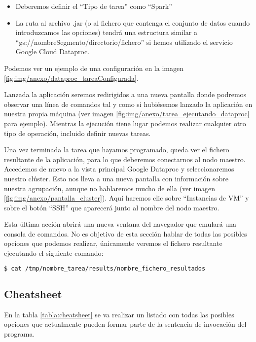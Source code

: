 \begin{itemize}
\item Deberemos definir el ``Tipo de tarea'' como ``Spark''
\item La ruta al archivo .jar (o al fichero que contenga el conjunto de datos cuando introduzcamos las opciones) tendrá una estructura similar a ``gs://nombreSegmento/directorio/fichero'' si hemos utilizado el servicio Google Cloud Dataproc.
\end{itemize}


Podemos ver un ejemplo de una configuración en la imagen \ref{fig:img/anexo/dataproc_tareaConfigurada}.


Lanzada la aplicación seremos redirigidos a una nueva pantalla donde podremos observar una línea de comandos tal y como si hubiésemos  lanzado la aplicación en nuestra propia máquina (ver imagen \ref{fig:img/anexo/tarea_ejecutando_dataproc} para ejemplo). Mientras la ejecución tiene lugar podemos realizar cualquier otro tipo de operación, incluido definir nuevas tareas.


Una vez terminada la tarea que hayamos programado, queda ver el fichero resultante de la aplicación, para lo que deberemos conectarnos al nodo maestro. Accedemos de nuevo a la vista principal Google Dataproc y seleccionaremos nuestro clúster. Esto nos lleva a una nueva pantalla con información sobre nuestra agrupación, aunque no hablaremos mucho de ella (ver imagen \ref{fig:img/anexo/pantalla_cluster}). Aquí haremos clic sobre ``Instancias de VM'' y sobre el botón ``SSH'' que aparecerá junto al nombre del nodo maestro.


Esta última acción abrirá una nueva ventana del navegador que emulará una consola de comandos. No es objetivo de esta sección hablar de todas las posibles opciones que podemos realizar, únicamente veremos el fichero resultante ejecutando el siguiente comando:


\begin{lstlisting}[language=bash]
$ cat /tmp/nombre_tarea/results/nombre_fichero_resultados
\end{lstlisting}

\subsection{Cheatsheet}\label{subsec:cheatsheet}
En la tabla \ref{tabla:cheatsheet} se va realizar un listado con todas las posibles opciones que actualmente pueden formar parte de la sentencia de invocación del programa.


